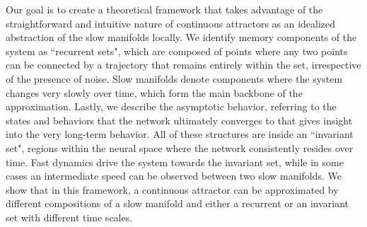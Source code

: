 \documentclass[12pt,letterpaper, onecolumn]{article}
\theoremstyle{definition}
\theoremstyle{remark}
\begin{document}

Our goal is to create a theoretical framework that takes advantage of the straightforward and intuitive nature of continuous attractors as an idealized abstraction of the slow manifolds locally.
We identify memory components of the system as ``recurrent sets", which are composed of points where any two points can be connected by a trajectory that remains entirely within the set, irrespective of the presence of noise.
Slow manifolds denote components where the system changes very slowly over time, which form the main backbone of the approximation.
Lastly, we describe the asymptotic behavior, referring to the states and behaviors that the network ultimately converges to that gives insight into the very long-term behavior.
All of these structures are inside an ``invariant set", regions within the neural space where the network consistently resides over time.
Fast dynamics drive the system towards the invariant set, while in some cases an intermediate speed can be observed between two slow manifolds.
We show that in this framework, a continuous attractor can be approximated by different compositions of a slow manifold and either a recurrent or an invariant set with different time scales.



\end{document}
